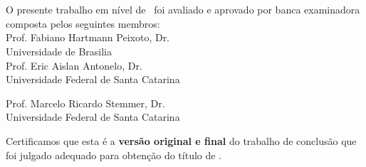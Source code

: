 \imprimircapa

\imprimirfolhaderosto*

\begin{fichacatalografica}
	
\end{fichacatalografica}

\begin{folhadeaprovacao}
	\OnehalfSpacing
	\centering
	\imprimirautor\\%
	\vspace*{10pt}		
	\textbf{\textsf{\imprimirtitulo}}%
	\ifnotempty{\imprimirsubtitulo}{:~\imprimirsubtitulo}\\%
	\vspace*{\baselineskip}
    O presente trabalho em nível de \imprimirnivel~foi avaliado e aprovado por banca examinadora composta pelos seguintes membros:\\
	\vspace*{\baselineskip}
	Prof. Fabiano Hartmann Peixoto, Dr.\\
	Universidade de Brasilia\\
	\vspace*{\baselineskip}
	Prof. Eric Aislan Antonelo, Dr.\\
	Universidade Federal de Santa Catarina\\
	\vspace*{\baselineskip}

	Prof. Marcelo Ricardo Stemmer, Dr.\\
	Universidade Federal de Santa Catarina\\
	\vspace*{1\baselineskip}
	\begin{minipage}{\textwidth}
		Certificamos que esta é a \textbf{versão original e final} do trabalho de conclusão que foi julgado adequado para obtenção do título de \imprimirformacao.\\
	\end{minipage}
	

\end{folhadeaprovacao}
